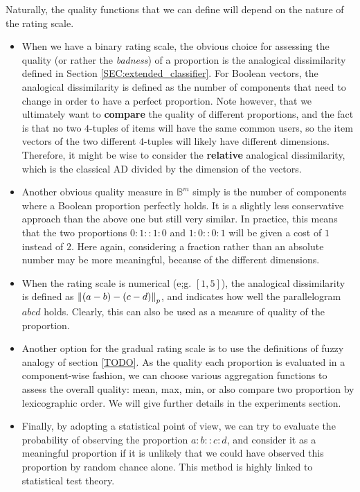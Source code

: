 Naturally, the quality functions that we can define will depend on the nature
of the rating scale.

\begin{itemize}
  \item When we have a binary rating scale, the obvious choice for assessing
    the quality (or rather the \textit{badness}) of a proportion is the
    analogical dissimilarity defined in Section \ref{SEC:extended_classifier}. For Boolean
    vectors, the analogical dissimilarity is defined as the number of
    components that need to change in order to have a perfect proportion. Note
    however, that we ultimately want to \textbf{compare} the quality of
    different proportions, and the fact is that no two $4$-tuples of items will
    have the same common users, so the item vectors of the two different
    $4$-tuples will likely have different dimensions. Therefore, it might be
    wise to consider the \textbf{relative} analogical dissimilarity, which is
    the classical AD divided by the dimension of the vectors.
  \item Another obvious quality measure in $\mathbb{B}^m$ simply is the number
    of components where a Boolean proportion perfectly holds. It is a slightly
    less conservative approach than the above one but still very similar. In
    practice, this means that the two proportions $0:1::1:0$ and $1:0::0:1$
    will be given a cost of $1$ instead of $2$. Here again, considering a
    fraction rather than an absolute number may be more meaningful, because
    of the different dimensions.
  \item When the rating scale is numerical (e;g. $[1, 5]$), the analogical dissimilarity is
    defined as $\norm{p}{(a - b) - (c - d)}$, and indicates how well the
    parallelogram $abcd$ holds. Clearly, this can also be used as a measure of
    quality of the proportion.
  \item Another option for the gradual rating scale is to use the definitions
    of fuzzy analogy of section \ref{TODO}. As the quality
    each proportion is evaluated in a component-wise fashion, we can choose
    various aggregation functions to assess the overall quality: mean, max,
    min, or also compare two proportion by lexicographic order. We will give
    further details in the experiments section.
  \item Finally, by adopting a statistical point of view, we can try to
    evaluate the probability of observing the proportion $a:b::c:d$, and
    consider it as a meaningful proportion if it is unlikely that we could have
    observed this proportion by random chance alone. This method is highly
    linked to statistical test theory.
\end{itemize}

